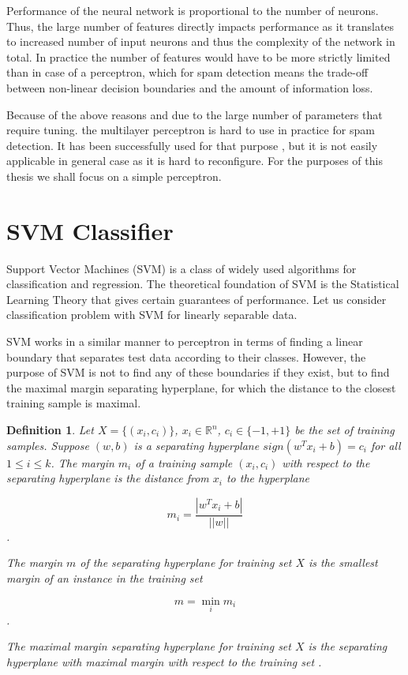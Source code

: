 \documentclass[12pt]{report}
\newcommand{\re}{\mathbb{R}}
\newtheorem{definition}{Definition}[section]
\begin{document}
Performance of the neural network is proportional to the number of neurons. Thus, the large number of features directly impacts performance as it translates to increased number of input neurons and thus the complexity of the network in total. In practice the number of features would have to be more strictly limited than in case of a perceptron, which for spam detection means the trade-off between non-linear decision boundaries and the amount of information loss.

Because of the above reasons and due to the large number of parameters that require tuning. the multilayer perceptron is hard to use in practice for spam detection. It has been successfully used for that purpose \cite{Tretyakov}, but it is not easily applicable in general case as it is hard to reconfigure. For the purposes of this thesis we shall focus on a simple perceptron.

\newpage

\section{SVM Classifier}

Support Vector Machines (SVM) is a class of widely used algorithms for classification and regression. The theoretical foundation of SVM is the Statistical Learning Theory that gives certain guarantees of performance. Let us consider classification problem with SVM for linearly separable data.

SVM works in a similar manner to perceptron in terms of finding a linear boundary that separates test data according to their classes. However, the purpose of SVM is not to find any of these boundaries if they exist, but to find the maximal margin separating hyperplane, for which the distance to the closest training sample is maximal.

\begin{definition}
	Let $X = \{(x_i, c_i)\}$, $x_i \in \re^n$, $c_i \in \{-1, +1\}$ be the set of training samples. Suppose $(w, b)$ is a separating hyperplane $sign(w^T x_i + b) = c_i$ for all $1 \leq i \leq k$. The margin $m_i$ of a training sample $(x_i, c_i)$ with respect to the separating hyperplane is the distance from $x_i$ to the hyperplane
	
	$$m_i = \dfrac{|w^T x_i + b|}{||w||}$$.
	
	The margin $m$ of the separating hyperplane for training set $X$ is the smallest margin of an instance in the training set
	
	$$m = \min_i m_i$$.
	
	The maximal margin separating hyperplane for training set $X$ is the separating hyperplane with maximal margin with respect to the training set \cite{Tretyakov}.
\end{definition}
\end{document}
